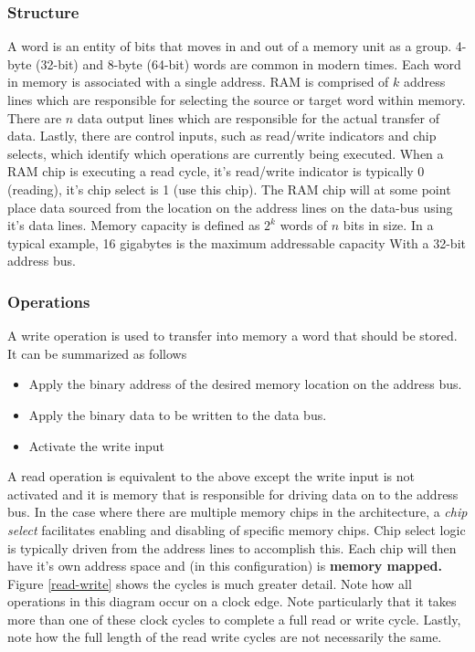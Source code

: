 \documentclass[10pt,a4paper]{article}
\begin{document}
\subsubsection{Structure}
A word is an entity of bits that moves in and out of a memory unit as a group. 4-byte (32-bit) and 8-byte (64-bit) words are common in modern times. Each word in memory is associated with a single address. RAM is comprised of $k$ address lines which are responsible for selecting the source or target word within memory. There are $n$ data output lines which are responsible for the actual transfer of data. Lastly, there are control inputs, such as read/write indicators and chip selects, which identify which operations are currently being executed. When a RAM chip is executing a read cycle, it's read/write indicator is typically 0 (reading), it's chip select is 1 (use this chip). The RAM chip will at some point place data sourced from the location on the address lines on the data-bus using it's data lines. \newline\newline
Memory capacity is defined as $2^{k}$ words of $n$ bits in size. In a typical example, 16 gigabytes is the maximum addressable capacity With a 32-bit address bus. 
\subsubsection{Operations}
A write operation is used to transfer into memory a word that should be stored. It can be summarized as follows
\begin{itemize}
\item Apply the binary address of the desired memory location on the address bus.
\item Apply the binary data to be written to the data bus.
\item Activate the write input
\end{itemize}
A read operation is equivalent to the above except the write input is not activated and it is memory that is responsible for driving data on to the address bus. In the case where there are multiple memory chips in the architecture, a \textit{chip select} facilitates enabling and disabling of specific memory chips. Chip select logic is typically driven from the address lines to accomplish this. Each chip will then have it's own address space and (in this configuration) is \textbf{memory mapped.} Figure \ref{read-write} shows the cycles is much greater detail. Note how all operations in this diagram occur on a clock edge. Note particularly that it takes more than one of these clock cycles to complete a full read or write cycle. Lastly, note how the full length of the read write cycles are not necessarily the same. 
\end{document}
